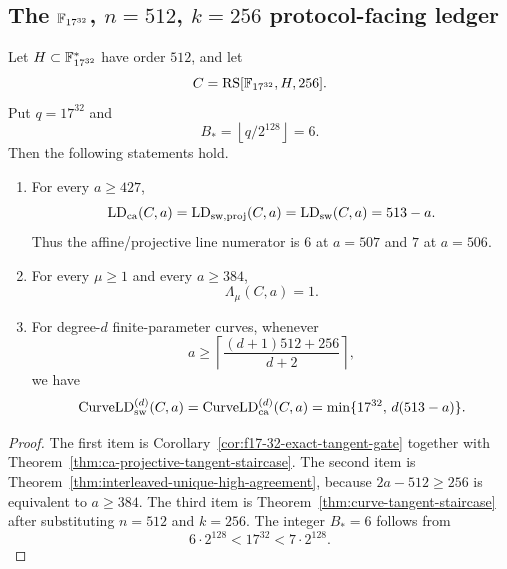 
\subsection{The \(\mathbb F_{17^{32}}\), \(n=512\), \(k=256\) protocol-facing ledger}

\begin{corollary}
\label{cor:f17-adjacent-ledgers}
Let \(H\subset\mathbb F_{17^{32}}^*\) have order \(512\), and let
\[
  C=\operatorname{RS}[\mathbb F_{17^{32}},H,256].
\]
Put \(q=17^{32}\) and
\[
  B_*=\left\lfloor q/2^{128}\right\rfloor=6.
\]
Then the following statements hold.

\begin{enumerate}
\item For every \(a\ge427\),
\[
  \operatorname{LD}_{\rm ca}(C,a)
  =
  \operatorname{LD}_{\rm sw,proj}(C,a)
  =
  \operatorname{LD}_{\rm sw}(C,a)
  =
  513-a.
\]
Thus the affine/projective line numerator is \(6\) at \(a=507\) and \(7\) at
\(a=506\).

\item For every \(\mu\ge1\) and every \(a\ge384\),
\[
  \Lambda_\mu(C,a)=1.
\]

\item For degree-\(d\) finite-parameter curves, whenever
\[
  a\ge
  \left\lceil\frac{(d+1)512+256}{d+2}\right\rceil,
\]
we have
\[
  \operatorname{CurveLD}_{\rm sw}^{(d)}(C,a)
  =
  \operatorname{CurveLD}_{\rm ca}^{(d)}(C,a)
  =
  \min\{17^{32},\,d(513-a)\}.
\]
\end{enumerate}
\end{corollary}

\begin{proof}
The first item is Corollary~\ref{cor:f17-32-exact-tangent-gate} together with
Theorem~\ref{thm:ca-projective-tangent-staircase}.  The second item is
Theorem~\ref{thm:interleaved-unique-high-agreement}, because
\(2a-512\ge256\) is equivalent to \(a\ge384\).  The third item is
Theorem~\ref{thm:curve-tangent-staircase} after substituting \(n=512\) and
\(k=256\).  The integer \(B_*=6\) follows from
\[
  6\cdot2^{128}<17^{32}<7\cdot2^{128}.
\]
\end{proof}

